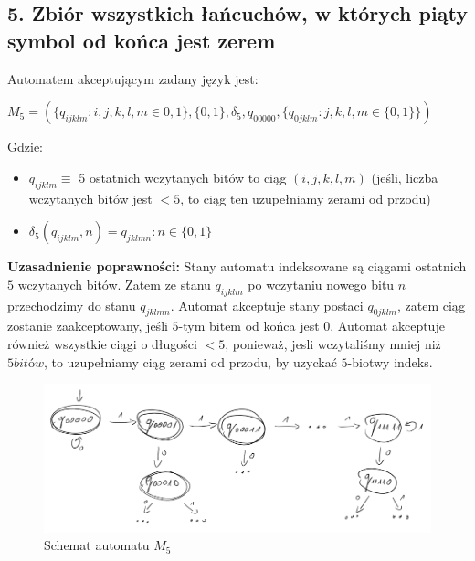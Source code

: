 \documentclass[12pt]{article}
\begin{document}
\newpage

\subsection*{5. Zbiór wszystkich łańcuchów, w których piąty symbol od końca jest zerem}
    Automatem akceptującym zadany język jest:
    \begin{center}
    \begin{math}
        M_5 = (\{q_{ijklm} : i, j, k, l, m \in {0, 1}\}, \{0, 1\}, \delta_5, q_{00000}, \{q_{0jklm} : j, k, l, m \in \{0, 1\}\})
    \end{math}
    \end{center}

    \noindent Gdzie:
    \begin{itemize}
        \item $q_{ijklm} \equiv$ 5 ostatnich wczytanych bitów to ciąg $(i, j, k, l, m)$
            (jeśli, liczba wczytanych bitów jest $< 5$, to ciąg ten uzupełniamy zerami od przodu)
        \item $\delta_5(q_{ijklm}, n) = q_{jklmn} : n \in \{0, 1\}$
    \end{itemize}

    \noindent \newline \textbf{Uzasadnienie poprawności:} \newline
    Stany automatu indeksowane są ciągami ostatnich $5$ wczytanych bitów. Zatem ze stanu $q_{ijklm}$
    po wczytaniu nowego bitu $n$ przechodzimy do stanu $q_{jklmn}$. Automat akceptuje stany postaci $q_{0jklm}$, zatem
    ciąg zostanie zaakceptowany, jeśli $5$-tym bitem od końca jest $0$. Automat akceptuje również wszystkie ciągi o
    długości $< 5$, ponieważ, jesli wczytaliśmy mniej niż $5 bitów$, to uzupełniamy ciąg zerami od przodu, by uzyckać
    $5$-biotwy indeks.


    \noindent
    \begin{figure}[h]
        \centering
        \includegraphics[width=\linewidth]{img/m5.png}
        \caption{Schemat automatu $M_5$}
        \label{fig:m5}
    \end{figure}
\end{document}

